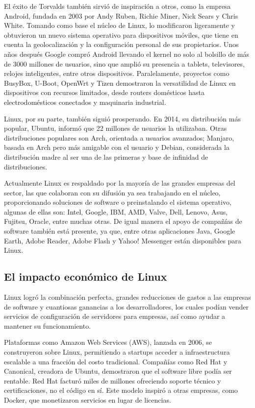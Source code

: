 \documentclass[a4paper,12pt]{article}
\begin{document}
El éxito de Torvalds también sirvió de inspiración a otros, como la empresa
Android, fundada en 2003 por Andy Ruben, Richie Miner, Nick Sears y Chris White.
Tomando como base el núcleo de Linux, lo modificaron ligeramente y obtuvieron un
nuevo sistema operativo para dispositivos móviles, que tiene en cuenta la
geolocalización y la configuración personal de sus propietarios. Unos años 
después Google compró Android llevando el kernel no solo al bolsillo de más de
3000 millones de usuarios, sino que amplió su presencia a tablets, televisores,
relojes inteligentes, entre otros dispositivos. Paralelamente, proyectos como
BusyBox, U-Boot, OpenWrt y Tizen demostraron la versatilidad de Linux en
dispositivos con recursos limitados, desde routers domésticos hasta 
electrodomésticos conectados y maquinaria industrial.

Linux, por su parte, también siguió prosperando. En 2014, su distribución más
popular, Ubuntu, informó que 22 millones de usuarios la utilizaban. Otras
distribuciones populares son Arch, orientada a usuarios avanzados; Manjaro,
basada en Arch pero más amigable con el usuario y Debian, considerada la 
distribución madre al ser una de las primeras y base de infinidad de
distribuciones. 

Actualmente Linux es respaldado por la mayoría de las grandes empresas del
sector, las que colaboran con su difusión ya sea trabajando en el núcleo,
proporcionando soluciones de software o preinstalando el sistema operativo,
algunas de ellas son: Intel, Google, IBM, AMD, Valve, Dell, Lenovo, Asus,
Fujitsu, Oracle, entre muchas otras. De igual manera el apoyo de compañías de
software también está presente, ya que, entre otras aplicaciones Java, Google
Earth, Adobe Reader, Adobe Flash y Yahoo! Messenger están disponibles para
Linux.  \subsection{El impacto económico de Linux}

Linux logró la combinación perfecta, grandes reducciones de gastos a las
empresas de software y cuantiosas ganancias a los desarrolladores, los cuales
podían vender servicios de configuración de servidores para empresas, así como
ayudar a mantener su funcionamiento. 

Plataformas como Amazon Web Services (AWS), lanzada en 2006, se construyeron
sobre Linux, permitiendo a startups acceder a infraestructura escalable a una
fracción del costo tradicional. Compañías como Red Hat y Canonical, creadora de
Ubuntu, demostraron que el software libre podía ser rentable. Red Hat facturó
miles de millones ofreciendo soporte técnico y certificaciones, no el código en
sí. Este modelo inspiró a otras empresas, como Docker, que monetizaron servicios
en lugar de licencias.
\end{document}
